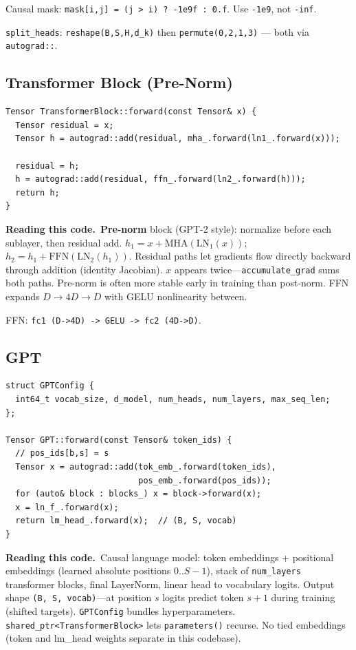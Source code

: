 \documentclass[11pt,a4paper]{article}
\newcommand{\explain}{\par\smallskip\noindent}
\newcommand{\exhead}{\textbf{Reading this code.}\ }
\begin{document}
Causal mask: \texttt{mask[i,j] = (j > i) ? -1e9f : 0.f}. Use \texttt{-1e9}, not
\texttt{-inf}.

\texttt{split\_heads}: \texttt{reshape(B,S,H,d\_k)} then \texttt{permute(0,2,1,3)} ---
both via \texttt{autograd::}.

\subsection{Transformer Block (Pre-Norm)}

\begin{lstlisting}[style=cpp]
Tensor TransformerBlock::forward(const Tensor& x) {
  Tensor residual = x;
  Tensor h = autograd::add(residual, mha_.forward(ln1_.forward(x)));

  residual = h;
  h = autograd::add(residual, ffn_.forward(ln2_.forward(h)));
  return h;
}
\end{lstlisting}
\explain\exhead \textbf{Pre-norm} block (GPT-2 style): normalize before each sublayer, then residual
add. $h_1 = x + \mathrm{MHA}(\mathrm{LN}_1(x))$; $h_2 = h_1 + \mathrm{FFN}(\mathrm{LN}_2(h_1))$.
Residual paths let gradients flow directly backward through addition (identity Jacobian). $x$
appears twice---\texttt{accumulate\_grad} sums both paths. Pre-norm is often more stable early
in training than post-norm. FFN expands $D \rightarrow 4D \rightarrow D$ with GELU nonlinearity
between.

FFN: \texttt{fc1 (D->4D) -> GELU -> fc2 (4D->D)}.

\subsection{GPT}

\begin{lstlisting}[style=cpp]
struct GPTConfig {
  int64_t vocab_size, d_model, num_heads, num_layers, max_seq_len;
};

Tensor GPT::forward(const Tensor& token_ids) {
  // pos_ids[b,s] = s
  Tensor x = autograd::add(tok_emb_.forward(token_ids),
                           pos_emb_.forward(pos_ids));
  for (auto& block : blocks_) x = block->forward(x);
  x = ln_f_.forward(x);
  return lm_head_.forward(x);  // (B, S, vocab)
}
\end{lstlisting}
\explain\exhead Causal language model: token embeddings + positional embeddings (learned absolute
positions $0..S-1$), stack of \texttt{num\_layers} transformer blocks, final LayerNorm, linear
head to vocabulary logits. Output shape \texttt{(B, S, vocab)}---at position $s$ logits predict
token $s{+}1$ during training (shifted targets). \texttt{GPTConfig} bundles hyperparameters.
\texttt{shared\_ptr<TransformerBlock>} lets \texttt{parameters()} recurse. No tied embeddings
(token and lm\_head weights separate in this codebase).
\end{document}
